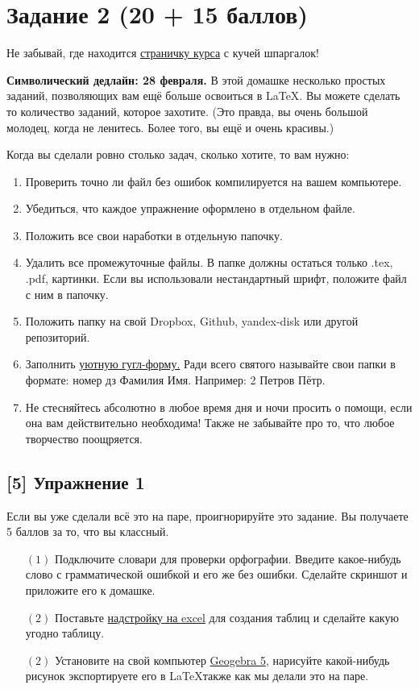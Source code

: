 \documentclass[12pt, a4paper, oneside]{article}
\begin{document}
\section*{Задание 2  (20 + 15 баллов)}

Не забывай, где находится  \href{https://fulyankin.github.io/LaTeX/}{страничку курса} с кучей шпаргалок!

\textbf{Символический дедлайн:  28 февраля.} В этой домашке несколько простых заданий, позволяющих вам ещё больше освоиться в \LaTeX{.}  Вы можете сделать то количество заданий, которое захотите. (Это правда, вы очень большой молодец, когда не ленитесь. Более того, вы ещё и очень красивы.) 

Когда вы сделали ровно столько задач, сколько хотите, то вам нужно:

\begin{enumerate}
\item Проверить точно ли файл без ошибок компилируется на вашем компьютере.
\item Убедиться, что каждое упражнение оформлено в отдельном файле.
\item Положить все свои наработки в отдельную папочку.
\item Удалить все промежуточные файлы. В папке должны остаться только .tex, .pdf, картинки. Если вы использовали нестандартный шрифт, положите файл с ним в папочку.
\item Положить папку на	свой	Dropbox, Github,	yandex-disk	или другой	репозиторий.
\item Заполнить	\href{https://docs.google.com/forms/d/e/1FAIpQLSe11kxKVfv07iCL1E9yNX7ll9swKImiVwRr1H70lslGzInRSg/viewform}{уютную гугл-форму.} Ради всего святого называйте свои папки в формате: номер дз Фамилия Имя. Например: 2 Петров Пётр.
\item Не стесняйтесь абсолютно в любое время дня и ночи просить о помощи, если она вам действительно необходима! Также не забывайте про то, что любое творчество поощряется. 
\end{enumerate}

\subsection*{[5]  Упражнение 1 }

Если вы уже сделали всё это на паре, проигнорируйте это задание. Вы получаете 5 баллов за то, что вы классный. 

\begin{itemize}
	\item[$(1)$]  Подключите словари для проверки орфографии. Введите какое-нибудь слово с грамматической ошибкой и его же без ошибки. Сделайте скриншот и приложите его к домашке. 
	\item [$(2)$]  Поставьте \href{https://www.ctan.org/pkg/excel2latex}{надстройку на excel} для создания таблиц и сделайте какую угодно таблицу. 
	\item[$(2)$]  Установите на свой компьютер \href{https://www.geogebra.org/download?lang=ru }{Geogebra 5}, нарисуйте какой-нибудь рисунок экспортируете его в \LaTeX также как мы делали это на паре. 
\end{itemize}
\end{document}

